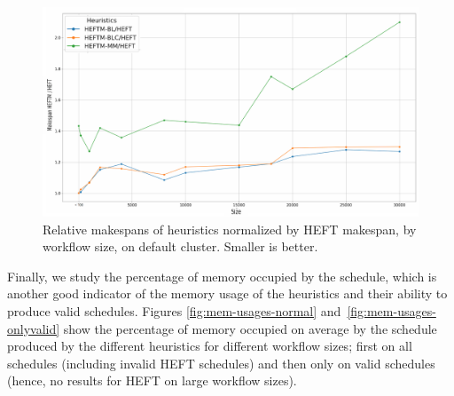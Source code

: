 \documentclass[conference]{IEEEtran}
\newcommand{\algo}[1]{\textsc{#1}}
\newcommand{\heft}{\algo{HEFT}\xspace}
\newcommand{\skug}[1]{{\color{blue}[SK: #1]}}
\begin{document}


%


\begin{figure}[tb]
    \centering
  \includegraphics[width=1\columnwidth] {images/makespan_relations_by_wf_size2}
    \vspace{-0.8cm}
    \caption{Relative makespans of heuristics normalized by \heft makespan, by workflow
    size, on default cluster. Smaller is better.}
    \label{fig:ms-relations-by-workflow}
    \vspace{-0.15cm}
\end{figure}


Finally, we study the percentage of memory occupied by the schedule, which is another good indicator
of the memory usage of the heuristics and their ability to produce valid schedules.  %
Figures \ref{fig:mem-usages-normal} and~\ref{fig:mem-usages-onlyvalid} show the percentage of memory
occupied on average by the schedule
produced by the different heuristics for different workflow sizes;
first on all schedules (including invalid \heft schedules) and then only on 
valid schedules (hence, no results for \heft on large workflow sizes).
%
\end{document}
